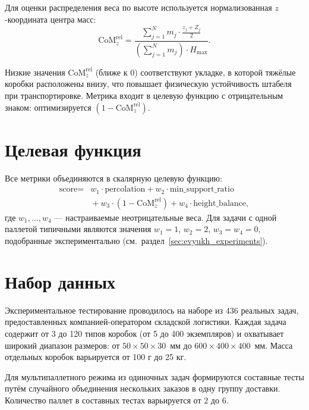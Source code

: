 Для оценки распределения веса по высоте используется нормализованная $z$-координата центра масс:
\[
\text{CoM}_z^{\text{rel}} = \frac{\sum_{j=1}^{N} m_j \cdot \frac{z_j + Z_j}{2}}{\left(\sum_{j=1}^{N} m_j\right) \cdot H_{\max}}.
\]

Низкие значения $\text{CoM}_z^{\text{rel}}$ (ближе к 0) соответствуют укладке, в которой тяжёлые коробки расположены внизу, что повышает физическую устойчивость штабеля при транспортировке. Метрика входит в целевую функцию с отрицательным знаком: оптимизируется $(1 - \text{CoM}_z^{\text{rel}})$.

\section{Целевая функция}

Все метрики объединяются в скалярную целевую функцию:
\[
\begin{split}
\text{score} = {}& w_1 \cdot \text{percolation}
    + w_2 \cdot \text{min\_support\_ratio} \\
&{}+ w_3 \cdot (1 - \text{CoM}_z^{\text{rel}})
    + w_4 \cdot \text{height\_balance},
\end{split}
\]
где $w_1, \ldots, w_4$ --- настраиваемые неотрицательные веса. Для задачи с одной паллетой типичными являются значения $w_1 = 1$, $w_2 = 2$, $w_3 = w_4 = 0$, подобранные экспериментально (см.~раздел~\ref{sec:evyukh_experiments}).

\section{Набор данных}

Экспериментальное тестирование проводилось на наборе из 436 реальных задач, предоставленных компанией-оператором складской логистики. Каждая задача содержит от 3 до 120 типов коробок (от 5 до 400 экземпляров) и охватывает широкий диапазон размеров: от $50 \times 50 \times 30$~мм до $600 \times 400 \times 400$~мм. Масса отдельных коробок варьируется от 100 г до 25 кг.

Для мультипаллетного режима из одиночных задач формируются составные тесты путём случайного объединения нескольких заказов в одну группу доставки. Количество паллет в составных тестах варьируется от 2 до 6.
